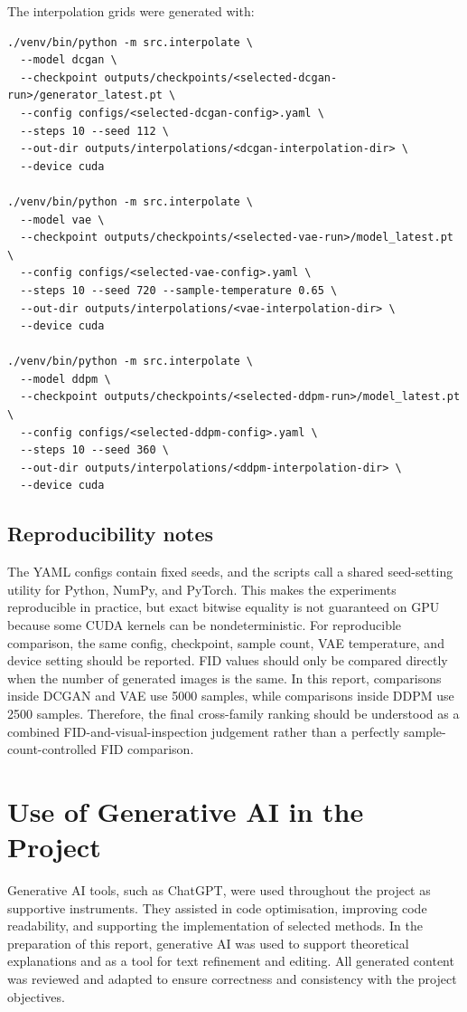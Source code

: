 \documentclass[11pt,a4paper]{article}
\begin{document}
The interpolation grids were generated with:
\begin{verbatim}
./venv/bin/python -m src.interpolate \
  --model dcgan \
  --checkpoint outputs/checkpoints/<selected-dcgan-run>/generator_latest.pt \
  --config configs/<selected-dcgan-config>.yaml \
  --steps 10 --seed 112 \
  --out-dir outputs/interpolations/<dcgan-interpolation-dir> \
  --device cuda

./venv/bin/python -m src.interpolate \
  --model vae \
  --checkpoint outputs/checkpoints/<selected-vae-run>/model_latest.pt \
  --config configs/<selected-vae-config>.yaml \
  --steps 10 --seed 720 --sample-temperature 0.65 \
  --out-dir outputs/interpolations/<vae-interpolation-dir> \
  --device cuda

./venv/bin/python -m src.interpolate \
  --model ddpm \
  --checkpoint outputs/checkpoints/<selected-ddpm-run>/model_latest.pt \
  --config configs/<selected-ddpm-config>.yaml \
  --steps 10 --seed 360 \
  --out-dir outputs/interpolations/<ddpm-interpolation-dir> \
  --device cuda
\end{verbatim}

\subsection{Reproducibility notes}

The YAML configs contain fixed seeds, and the scripts call a shared seed-setting utility for Python, NumPy, and PyTorch.
This makes the experiments reproducible in practice, but exact bitwise equality is not guaranteed on GPU because some CUDA kernels can be nondeterministic.
For reproducible comparison, the same config, checkpoint, sample count, VAE temperature, and device setting should be reported.
FID values should only be compared directly when the number of generated images is the same. In this report, comparisons inside DCGAN and VAE use 5000 samples, while comparisons inside DDPM use 2500 samples. Therefore, the final cross-family ranking should be understood as a combined FID-and-visual-inspection judgement rather than a perfectly sample-count-controlled FID comparison.

\section{Use of Generative AI in the Project}

Generative AI tools, such as ChatGPT, were used throughout the project as supportive instruments.
They assisted in code optimisation, improving code readability, and supporting the implementation of selected methods.
In the preparation of this report, generative AI was used to support theoretical explanations and as a tool for text refinement and editing.
All generated content was reviewed and adapted to ensure correctness and consistency with the project objectives.
\end{document}
